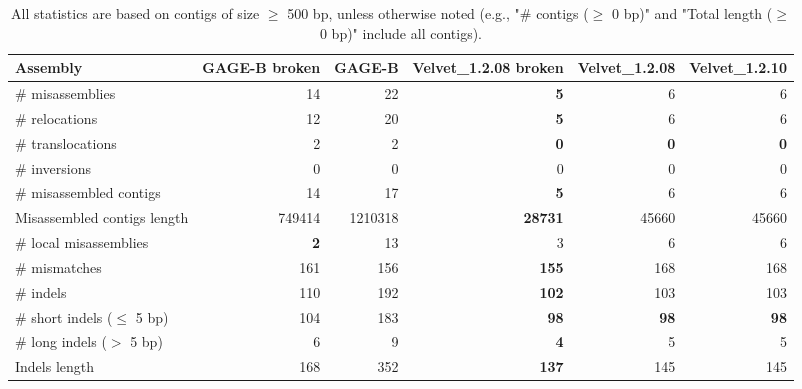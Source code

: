 \documentclass[12pt,a4paper]{article}
\begin{document}
\begin{table}[ht]
\begin{center}
\caption{All statistics are based on contigs of size $\geq$ 500 bp, unless otherwise noted (e.g., "\# contigs ($\geq$ 0 bp)" and "Total length ($\geq$ 0 bp)" include all contigs).}
\begin{tabular}{|l*{5}{|r}|}
\hline
Assembly & GAGE-B broken & GAGE-B & Velvet\_1.2.08 broken & Velvet\_1.2.08 & Velvet\_1.2.10 \\ \hline
\# misassemblies & 14 & 22 & {\bf 5} & 6 & 6 \\ \hline
\hspace{5mm}\# relocations & 12 & 20 & {\bf 5} & 6 & 6 \\ \hline
\hspace{5mm}\# translocations & 2 & 2 & {\bf 0} & {\bf 0} & {\bf 0} \\ \hline
\hspace{5mm}\# inversions & 0 & 0 & 0 & 0 & 0 \\ \hline
\# misassembled contigs & 14 & 17 & {\bf 5} & 6 & 6 \\ \hline
Misassembled contigs length & 749414 & 1210318 & {\bf 28731} & 45660 & 45660 \\ \hline
\# local misassemblies & {\bf 2} & 13 & 3 & 6 & 6 \\ \hline
\# mismatches & 161 & 156 & {\bf 155} & 168 & 168 \\ \hline
\# indels & 110 & 192 & {\bf 102} & 103 & 103 \\ \hline
\hspace{5mm}\# short indels ($\leq$ 5 bp) & 104 & 183 & {\bf 98} & {\bf 98} & {\bf 98} \\ \hline
\hspace{5mm}\# long indels ($>$ 5 bp) & 6 & 9 & {\bf 4} & 5 & 5 \\ \hline
Indels length & 168 & 352 & {\bf 137} & 145 & 145 \\ \hline
\end{tabular}
\end{center}
\end{table}
\end{document}
